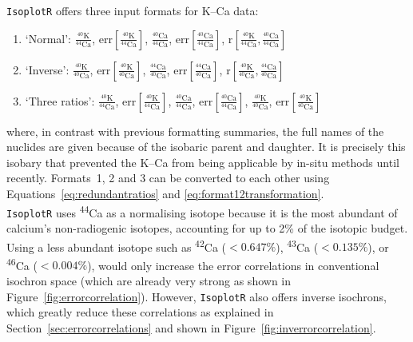 \begin{refsection}
\texttt{IsoplotR} offers three input formats for K--Ca data:
\begin{enumerate}
\item{`Normal':}
  $\frac{{}^{40}\mbox{K}}{{}^{44}\mbox{Ca}}$,  
  $\mbox{err}\!\left[\frac{{}^{40}\mbox{K}}{{}^{44}\mbox{Ca}}\right]$, 
  $\frac{{}^{40}\mbox{Ca}}{{}^{44}\mbox{Ca}}$,
  $\mbox{err}\!\left[\frac{{}^{40}\mbox{Ca}}{{}^{44}\mbox{Ca}}\right]$,  
  $\mbox{r}\!\left[\frac{{}^{40}\mbox{K}}{{}^{44}\mbox{Ca}},
    \frac{{}^{40}\mbox{Ca}}{{}^{44}\mbox{Ca}}\right]$
\item{`Inverse':}
  $\frac{{}^{40}\mbox{K}}{{}^{40}\mbox{Ca}}$,  
  $\mbox{err}\!\left[\frac{{}^{40}\mbox{K}}{{}^{40}\mbox{Ca}}\right]$, 
  $\frac{{}^{44}\mbox{Ca}}{{}^{40}\mbox{Ca}}$,  
  $\mbox{err}\!\left[\frac{{}^{44}\mbox{Ca}}{{}^{40}\mbox{Ca}}\right]$,  
  $\mbox{r}\!\left[\frac{{}^{40}\mbox{K}}{{}^{40}\mbox{Ca}},
    \frac{{}^{44}\mbox{Ca}}{{}^{40}\mbox{Ca}}\right]$
\item{`Three ratios':}
  $\frac{{}^{40}\mbox{K}}{{}^{44}\mbox{Ca}}$,  
  $\mbox{err}\!\left[\frac{{}^{40}\mbox{K}}{{}^{44}\mbox{Ca}}\right]$, 
  $\frac{{}^{40}\mbox{Ca}}{{}^{44}\mbox{Ca}}$,
  $\mbox{err}\!\left[\frac{{}^{40}\mbox{Ca}}{{}^{44}\mbox{Ca}}\right]$,  
  $\frac{{}^{40}\mbox{K}}{{}^{40}\mbox{Ca}}$,  
  $\mbox{err}\!\left[\frac{{}^{40}\mbox{K}}{{}^{40}\mbox{Ca}}\right]$
\end{enumerate}

\noindent where, in contrast with previous formatting summaries, the
full names of the nuclides are given because of the isobaric parent
and daughter. It is precisely this isobary that prevented the K--Ca
from being applicable by in-situ methods until recently. Formats~1, 2
and 3 can be converted to each other using
Equations~\ref{eq:redundantratios} and
\ref{eq:format12transformation}.\\

\texttt{IsoplotR} uses \textsuperscript{44}Ca as a normalising isotope
because it is the most abundant of calcium's non-radiogenic isotopes,
accounting for up to 2\% of the isotopic budget. Using a less abundant
isotope such as \textsuperscript{42}Ca ($<0.647\%$),
\textsuperscript{43}Ca ($<0.135\%$), or \textsuperscript{46}Ca
($<0.004\%$), would only increase the error correlations in
conventional isochron space (which are already very strong as shown in
Figure~\ref{fig:errorcorrelation}). However, \texttt{IsoplotR} also
offers inverse isochrons, which greatly reduce these correlations as
explained in Section~\ref{sec:errorcorrelations} and shown in
Figure~\ref{fig:inverrorcorrelation}.

\printbibliography[heading=subbibliography]

\end{refsection}
